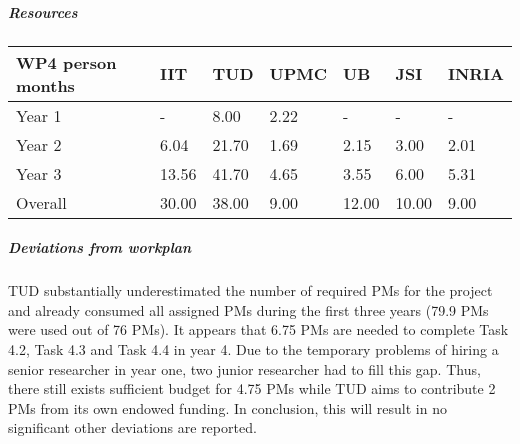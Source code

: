 
\subparagraph{Resources}

\begin{center}
\begin{tabular}{|C{1.5cm}|C{1.5cm}|C{1.5cm}|C{2cm}|C{2cm}|C{2cm}|C{2cm}|}
\hline
\footnotesize \textbf{WP4 person months}& \footnotesize \textbf{IIT}&\footnotesize \textbf{TUD}&\footnotesize \textbf{UPMC}& \footnotesize \textbf{UB} &\footnotesize \textbf{JSI} &\footnotesize \textbf{INRIA}\\ \hline
\footnotesize Year 1  &  -  & 8.00 & 2.22 & - & - & -     \\  \hline
\footnotesize Year 2  &  6.04  & 21.70 & 1.69 & 2.15 & 3.00 & 2.01     \\  \hline
\footnotesize Year 3  &  13.56 & 41.70 & 4.65 & 3.55 & 6.00 & 5.31 \\  
\hline \hline
\footnotesize Overall &  30.00 & 38.00 & 9.00 & 12.00 & 10.00 & 9.00 \\ \hline
\end{tabular}
\end{center}

\subparagraph{Deviations from workplan} 
TUD substantially underestimated the number of required PMs for the project and already consumed all assigned PMs during the first three years (79.9 PMs were used out of 76 PMs). It appears that 6.75 PMs are needed to complete Task 4.2, Task 4.3 and Task 4.4 in year 4. Due to the temporary problems of hiring a senior researcher in year one, two junior researcher had to fill this gap. Thus, there still exists sufficient budget for 4.75 PMs while TUD aims to contribute 2 PMs from its own endowed funding. In conclusion, this will result in no significant other deviations are reported.

